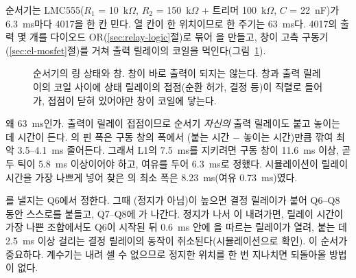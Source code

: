 \Ours 순서기는 LMC555($R_1$ = 10~k$\Omega$, $R_2$ = 150~k$\Omega$ + 트리머 100~k$\Omega$, $C$ = 22~nF)가 6.3~ms마다
4017을 한 칸 민다. 열 칸이 한 위치이므로 한 주기는 63~ms다. 4017의 출력 몇 개를 다이오드 OR(\ref{sec:relay-logic}절)로 묶어
을 만들고, 창이 고측 구동기(\ref{sec:el-mosfet}절)를 거쳐 출력 릴레이의 코일을 먹인다(그림~\ref{fig:t-ring}).

\begin{figure}[ht]
\centering
{}
\caption{순서기의 링 상태와 창. 창이 바로 출력이 되지는 않는다. 창과 출력 릴레이의 코일 사이에 상태 릴레이의
접점(순환 허가,  결정 등)이 직렬로 들어가, 접점이 닫혀 있어야만 창이 코일에 닿는다.}
\label{fig:t-ring}
\end{figure}

왜 63~ms인가. 출력이 릴레이 접점이므로 순서기 \emph{자신의} 출력 릴레이도 붙고 놓이는 데 시간이 든다.
의 핀 폭은 구동 창의 폭에서 (붙는 시간 $-$ 놓이는 시간)만큼 깎여 최악 3.5--4.1~ms 줄어든다. 그래서
L1의 7.5~ms를 지키려면 구동 창이 11.6~ms 이상, 곧 두 틱이 5.8~ms 이상이어야 하고, 여유를 두어 6.3~ms로 정했다.
시뮬레이션이 릴레이 시간을 가장 나쁘게 넣어 찾은 의 최소 폭은 8.23~ms(여유 0.73~ms)였다.

를 낼지는 Q6에서 정한다. 그때 (정지가 아님)이 높으면  결정 릴레이가 붙어 Q6--Q8 동안
스스로를 붙들고, Q7--Q8에 가 나간다. 정지가 나서 이 내려가면, 릴레이 시간이 가장 나쁜
조합에서도 Q6이 시작된 뒤 0.6~ms 안에 을 따르는 릴레이가 열려, 붙는 데 2.5~ms 이상 걸리는 결정
릴레이의 동작이 취소된다(시뮬레이션으로 확인). 이 순서가 중요하다. 계수기는 내려 셀 수 없으므로 정지한 위치를 한 번 지나치면 되돌아올
방법이 없다.

